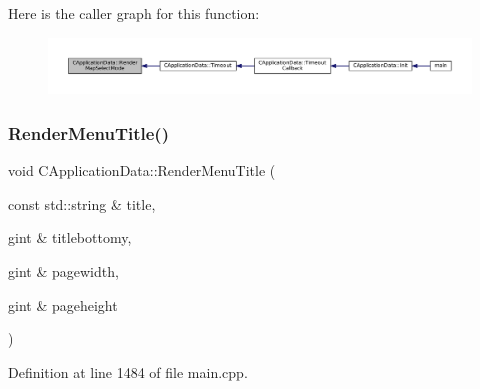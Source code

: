 Here is the caller graph for this function\+:
\nopagebreak
\begin{figure}[H]
\begin{center}
\leavevmode
\includegraphics[width=350pt]{classCApplicationData_a72fff3a266be49b3e9f323dcfe545923_icgraph}
\end{center}
\end{figure}
\hypertarget{classCApplicationData_a548c5924a281c7e226fd7cac44e59920}{}\label{classCApplicationData_a548c5924a281c7e226fd7cac44e59920} 
\subsubsection{\texorpdfstring{Render\+Menu\+Title()}{RenderMenuTitle()}}
{\footnotesize\ttfamily void C\+Application\+Data\+::\+Render\+Menu\+Title (\begin{DoxyParamCaption}\item[{const std\+::string \&}]{title,  }\item[{gint \&}]{titlebottomy,  }\item[{gint \&}]{pagewidth,  }\item[{gint \&}]{pageheight }\end{DoxyParamCaption})\hspace{0.3cm}{\ttfamily [protected]}}



Definition at line 1484 of file main.\+cpp.


